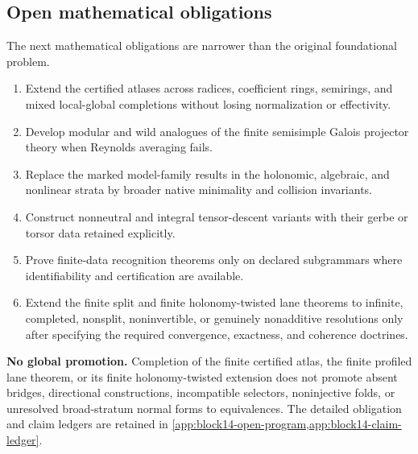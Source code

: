\subsection{Open mathematical obligations}

The next mathematical obligations are narrower than the original foundational problem.
\begin{enumerate}
\item Extend the certified atlases across radices, coefficient rings, semirings, and mixed local-global completions without losing normalization or effectivity.
\item Develop modular and wild analogues of the finite semisimple Galois projector theory when Reynolds averaging fails.
\item Replace the marked model-family results in the holonomic, algebraic, and nonlinear strata by broader native minimality and collision invariants.
\item Construct nonneutral and integral tensor-descent variants with their gerbe or torsor data retained explicitly.
\item Prove finite-data recognition theorems only on declared subgrammars where identifiability and certification are available.
\item Extend the finite split and finite holonomy-twisted lane theorems to infinite, completed, nonsplit, noninvertible, or genuinely nonadditive resolutions only after specifying the required convergence, exactness, and coherence doctrines.
\end{enumerate}

\begin{boundarybox}
\textbf{No global promotion.}
Completion of the finite certified atlas, the finite profiled lane theorem, or its finite holonomy-twisted extension does not promote absent bridges, directional constructions, incompatible selectors, noninjective folds, or unresolved broad-stratum normal forms to equivalences.  The detailed obligation and claim ledgers are retained in \cref{app:block14-open-program,app:block14-claim-ledger}.
\end{boundarybox}

